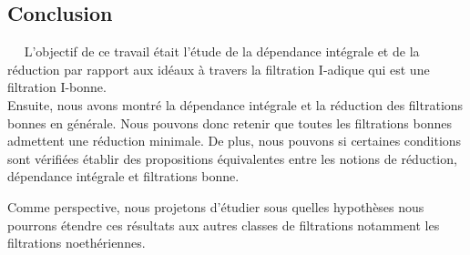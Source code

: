\begin{center}
	\chapter*{Conclusion}
\end{center}

$ \quad $ L'objectif de ce travail était l'étude de la dépendance intégrale et de la réduction par rapport aux idéaux à travers la filtration I-adique qui est une filtration I-bonne. \\
Ensuite, nous avons montré la dépendance intégrale et la réduction des filtrations bonnes en générale. Nous pouvons donc retenir que toutes les filtrations bonnes admettent une réduction minimale. De plus, nous pouvons si certaines conditions sont vérifiées établir des propositions équivalentes entre les notions de réduction, dépendance intégrale et filtrations bonne.

Comme perspective, nous projetons d'étudier sous quelles hypothèses nous pourrons étendre ces résultats aux autres classes de filtrations notamment les filtrations noethériennes.


